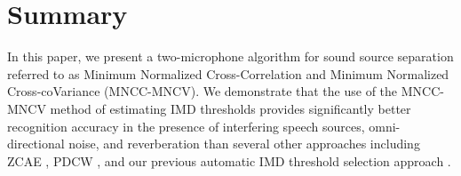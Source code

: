 \documentclass{article}
\begin{document}
\section{Summary}
 In this paper, we present a two-microphone algorithm for sound source separation 
    referred to as Minimum Normalized Cross-Correlation and Minimum Normalized 
    Cross-coVariance (MNCC-MNCV).  
We demonstrate that the use of the MNCC-MNCV method of estimating IMD
    thresholds  provides significantly better recognition accuracy in the
    presence of   interfering speech sources, omni-directional noise, and
    reverberation than several other approaches including ZCAE
    \cite{H_Park_SpeechComm_2009}, PDCW \cite{C_Kim_INTERSPEECH_2009_1}, and
    our previous automatic IMD threshold selection approach
    \cite{C_Kim_INTERSPEECH_2010_1}. 
%
%
%
%
%

%

\end{document}
